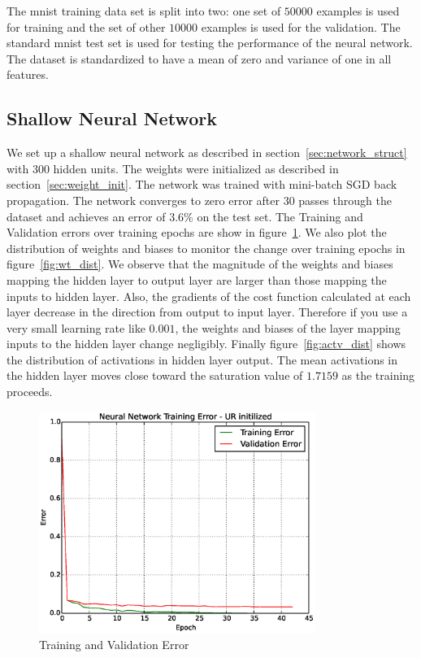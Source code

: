 \documentclass[Proceedings]{ascelike}
\begin{document}
 The mnist training data set is split into two: one set of
$50000$ examples is used for training and the set of other $10000$ examples is
used for the validation. The standard mnist test set is used for testing the
performance of the neural network. The dataset is standardized to have a mean
of zero and variance of one in all features.  \subsection{Shallow Neural
Network} We set up a shallow neural network as described in
section~\ref{sec:network_struct} with $300$ hidden units. The weights were
initialized as described in section~\ref{sec:weight_init}. The network was
trained with mini-batch SGD back propagation. The network converges to zero
error after $30$ passes through the dataset and achieves an error of $3.6\%$ on
the test set. The Training and Validation errors over training epochs are show
in figure~\ref{fig:sn_test_err}. We also plot the distribution of weights and
biases to  monitor the change over training epochs in figure~\ref{fig:wt_dist}.
We observe that the magnitude of the weights and biases mapping the hidden
layer to output layer are larger than those mapping the inputs to hidden layer.
Also, the gradients of the cost function calculated at each layer decrease in
the direction from output to input layer. Therefore if you use a very small
learning rate like $0.001$, the weights and biases of the layer mapping inputs
to the hidden layer change negligibly. Finally figure~\ref{fig:actv_dist} shows
the distribution of activations in hidden layer output. The mean activations in
the hidden layer moves close toward the saturation value of $1.7159$ as the
training proceeds.

\begin{figure} \caption{Training and Validation Error}
\label{fig:sn_test_err} \centering \includegraphics[width=0.8\textwidth,
keepaspectratio]{shallownet_perf.eps} \end{figure}
\end{document}
